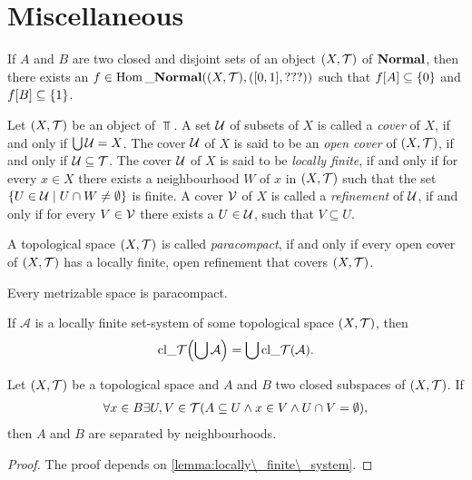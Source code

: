 \section{Miscellaneous}

\begin{lemma} \label{lemma:Urysohn} \cite[p. 445]{Ana1&2}
	If $A$ and $B$ are two closed and disjoint sets of an object $\tspace$ of $\Normal$, then there exists an $f \in \Hom\_\Normal\pbraces{\tspace, \pbraces{[0,1], ???}}$ such that $f\bbraces{A} \subseteq \{0\}$ and $f\bbraces{B} \subseteq \{1\}$. 
\end{lemma}


\begin{definition}
	Let $\tspace$ be an object of $\Top$. A set $\cover$ of subsets of $X$ is called a \textit{cover} of $X$, if and only if $\bigcup \cover = X$. The cover $\cover$ of $X$ is said to be an \textit{open cover} of $\tspace$, if and only if $\cover \subseteq \mathcal{T}$. The cover $\cover$ of $X$ is said to be \textit{locally finite}, if and only if for every $x \in X$ there exists a neighbourhood $W$ of $x$ in $\tspace$ such that the set $\Bbraces{U \in \cover\mid U \cap W \neq \emptyset}$ is finite. A cover $\cover[V]$ of $X$ is called a \textit{refinement} of $\cover$, if and only if for every $V \in \cover[V]$ there exists a $U \in \cover$, such that $V \subseteq U$. 
\end{definition}

\begin{definition}
	A topological space $\tspace$ is called \textit{paracompact}, if and only if every open cover of $\tspace$ has a locally finite, open refinement that covers $\tspace$. 
\end{definition}

\begin{theorem}\label{theorem:stone}
	Every metrizable space is paracompact. \cite{Top}
\end{theorem}

\begin{lemma} \label{lemma:locally\_finite\_system} \cite[p. 63]{Top}
	If $\mathcal{A}$ is a locally finite set-system of some topological space $\tspace$, then
	\begin{align*}
		\cl{\bigcup \mathcal{A}} = \bigcup \cl{\mathcal{A}}.
	\end{align*}
\end{lemma}

\begin{lemma} \label{lemma:para\_separation} \cite[p. 71]{Top}
	Let $\tspace$ be a topological space and $A$ and $B$ two closed subspaces of $\tspace$. If 
	\begin{align*}
		\forall x \in B\exists U, V \in \mathcal{T}\pbraces{A \subseteq U \land x \in V \land U \cap V = \emptyset},
	\end{align*}
	then $A$ and $B$ are separated by neighbourhoods. 
\end{lemma}
\begin{proof}
	The proof depends on \ref{lemma:locally\_finite\_system}.
\end{proof}

